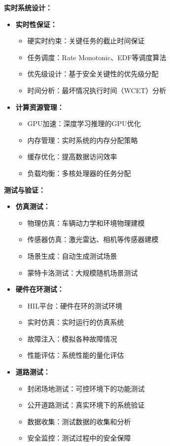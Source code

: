 \textbf{实时系统设计：}
\begin{itemize}
\item \textbf{实时性保证：}
\begin{itemize}
\item 硬实时约束：关键任务的截止时间保证
\item 任务调度：Rate Monotonic、EDF等调度算法
\item 优先级设计：基于安全关键性的优先级分配
\item 时间分析：最坏情况执行时间（WCET）分析
\end{itemize}
\item \textbf{计算资源管理：}
\begin{itemize}
\item GPU加速：深度学习推理的GPU优化
\item 内存管理：实时系统的内存分配策略
\item 缓存优化：提高数据访问效率
\item 负载均衡：多核处理器的任务分配
\end{itemize}
\end{itemize}

\textbf{测试与验证：}
\begin{itemize}
\item \textbf{仿真测试：}
\begin{itemize}
\item 物理仿真：车辆动力学和环境物理建模
\item 传感器仿真：激光雷达、相机等传感器建模
\item 场景生成：自动生成测试场景
\item 蒙特卡洛测试：大规模随机场景测试
\end{itemize}
\item \textbf{硬件在环测试：}
\begin{itemize}
\item HIL平台：硬件在环的测试环境
\item 实时仿真：实时运行的仿真系统
\item 故障注入：模拟各种故障情况
\item 性能评估：系统性能的量化评估
\end{itemize}
\item \textbf{道路测试：}
\begin{itemize}
\item 封闭场地测试：可控环境下的功能测试
\item 公开道路测试：真实环境下的系统验证
\item 数据收集：测试数据的收集和分析
\item 安全监控：测试过程中的安全保障
\end{itemize}
\end{itemize}

